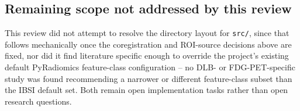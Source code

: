 \subsection{Remaining scope not addressed by this review}

This review did not attempt to resolve the directory layout for \texttt{src/}, since that follows mechanically once the coregistration and ROI-source decisions above are fixed, nor did it find literature specific enough to override the project's existing default PyRadiomics feature-class configuration -- no DLB- or FDG-PET-specific study was found recommending a narrower or different feature-class subset than the IBSI default set. Both remain open implementation tasks rather than open research questions.
